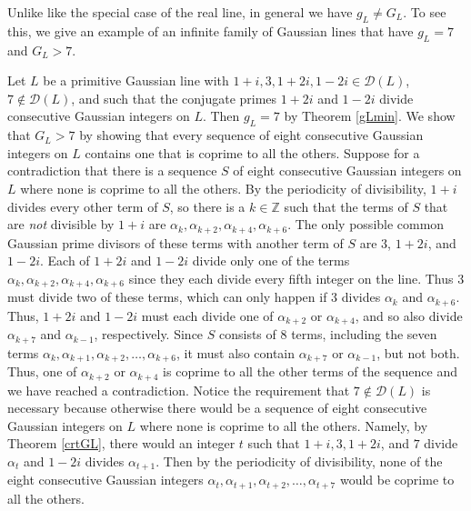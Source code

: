 \documentclass[11pt]{article}
\newcommand{\Z}{\mathbb{Z}}
\newcommand{\DL}{{\mathcal{D}}(L)}
\begin{document}
Unlike like the special case of the real line, in general we have $g_L\neq G_L$.  To see  this, we give an example of an infinite family of Gaussian lines that have $g_L=7$ and $G_L>7$.

\bigskip

 Let $L$ be a primitive Gaussian line with $1+i, 3, 1+2i,1-2i\in\DL$, $7\not\in\DL$, and such that the conjugate primes $1+2i$ and $1-2i$ divide consecutive Gaussian integers on $L$. Then $g_L=7$ by Theorem \ref{gLmin}.  We show that $G_L>7$ by showing that every sequence of eight consecutive Gaussian integers on $L$ contains one that is coprime to all the others.  Suppose for a contradiction that there is a sequence $S$ of eight consecutive Gaussian integers on $L$ where none is coprime to all the others.  By the periodicity of divisibility,  $1+i$ divides every other term of $S$, so there is a  $k\in\Z$ such that the terms of $S$ that are {\em not} divisible by $1+i$ are 
$\alpha_k, \alpha_{k+2}, \alpha_{k+4}, \alpha_{k+6}$. The only possible common Gaussian prime divisors of these terms with another term of $S$ are $3$, $1+2i$, and $1-2i$. Each of $1+2i$ and $1-2i$ divide only one of the terms $\alpha_k, \alpha_{k+2}, \alpha_{k+4}, \alpha_{k+6}$ since they each divide every fifth integer on the line.  Thus 3 must divide two of these terms, which can only happen if 3 divides $\alpha_k$ and $\alpha_{k+6}$.  Thus, $1+2i$ and $1-2i$ must each divide one of $\alpha_{k+2}$ or $\alpha_{k+4}$, and so also divide $\alpha_{k+7}$ and $\alpha_{k-1}$, respectively. Since $S$ consists of 8 terms, including the seven terms $\alpha_k, \alpha_{k+1}, \alpha_{k+2}, \ldots, \alpha_{k+6}$, it must also contain $\alpha_{k+7}$ or $\alpha_{k-1}$, but not both.  Thus, one of $\alpha_{k+2}$ or $\alpha_{k+4}$ is coprime to all the other terms of the sequence and we have reached a contradiction. 
 Notice the requirement that $7\not\in\DL$ is necessary because otherwise there  would be a sequence of eight consecutive Gaussian integers on $L$ where none is coprime to all the others. Namely, by Theorem \ref{crtGL}, there would an integer $t$ such that $1+i, 3, 1+2i$, and $7$ divide $\alpha_t$ and $1-2i$ divides $\alpha_{t+1}$.  Then by the periodicity of divisibility, none of the eight consecutive Gaussian integers $\alpha_t, \alpha_{t+1}, \alpha_{t+2}, \ldots , \alpha_{t+7}$ would be coprime to all the others.
\end{document}
